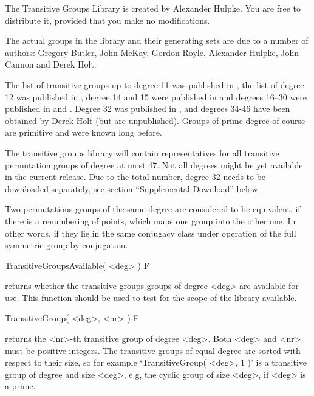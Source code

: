 
The Transitive Groups Library is created by Alexander Hulpke.
You are free to distribute it, provided that you make no modifications.

The actual groups in the library and their generating sets are due to a
number of authors:
Gregory Butler, John McKay, Gordon
Royle, Alexander Hulpke, John Cannon and Derek Holt. 

The list of transitive  groups up  to degree 11
was published in \cite{BM83},  the list of degree  12 was published in
\cite{Roy87}, degree 14 and  15 were published in  \cite{Butler93} and
degrees 16--30 were published in \cite{Hulpke96} and \cite{HulpkeTG}.
Degree 32 was published in \cite{CanHolt32}, and degrees 34-46 have been
obtained by Derek Holt (but are unpublished).
Groups of prime degree of course are
primitive and were known long before.

The transitive groups library will contain representatives for all
transitive permutation groups of degree at most  47. Not all degrees might
be yet available in the current release. Due to the total number,
degree 32 needs to be downloaded separately, see section ``Supplemental
Download'' below.

Two permutations groups of the same degree are considered to be
equivalent, if there is a renumbering of points, which maps one group into
the other one.
In other words, if they lie in the same conjugacy class under operation
of the full symmetric group by conjugation.


\>TransitiveGroupsAvailable( <deg> ) F

returns whether the transitive groups groups of degree <deg> are available
for use. This function should be used to test for the scope of the library
available.

\>TransitiveGroup( <deg>, <nr> ) F

returns the <nr>-th transitive  group of degree <deg>.  Both  <deg> and
<nr> must be  positive integers. The transitive groups of equal  degree
are  sorted with  respect to   their  size, so for  example
`TransitiveGroup(  <deg>, 1 )' is a  transitive group  of degree and
size <deg>, e.g, the cyclic  group  of size <deg>,   if <deg> is a
prime.

